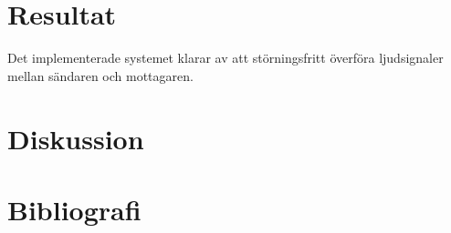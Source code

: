 \documentclass[a4paper,10pt]{article}
\begin{document}

\section{Resultat}

Det implementerade systemet klarar av att störningsfritt överföra ljudsignaler
mellan sändaren och mottagaren. 

\section{Diskussion}

\section{Bibliografi}

\begin{thebibliography}{hejhej}

\end{thebibliography}
\end{document}
